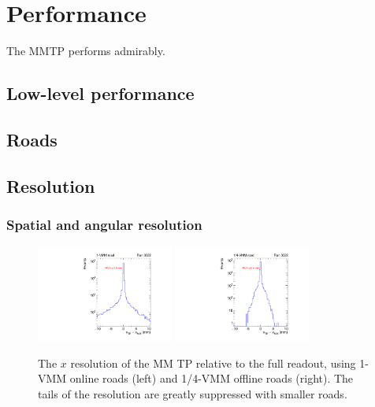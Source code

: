 \section{Performance}
\label{sec:perf}

The MMTP performs admirably.

\subsection{Low-level performance}
\label{sec:perf-simple}

\subsection{Roads}

\subsection{Resolution}
\label{sec:perf-res}

\subsubsection{Spatial and angular resolution}

\begin{figure}[!htpb]
  \begin{center}
    \includegraphics[width=0.4\textwidth]{figures/gbtanalysis3522/TP_xres_full.pdf}
    \includegraphics[width=0.4\textwidth]{figures/gbtanalysis3522/TP_xres.pdf}
  \end{center}
  \vspace{-10pt}
  \caption{The $x$ resolution of the MM TP relative to the full readout, using 1-VMM online roads (left) and 1/4-VMM offline roads (right). The tails of the resolution are greatly suppressed with smaller roads.}
  \label{fig:xres}
\end{figure}

